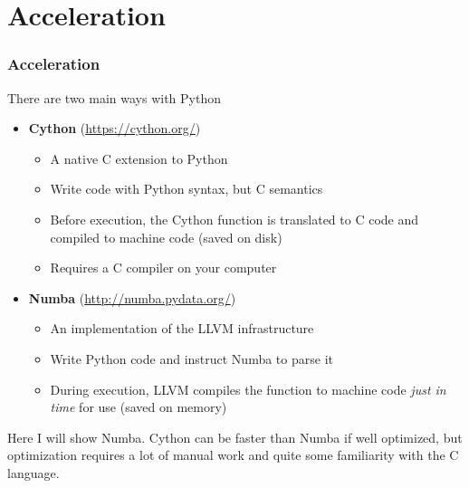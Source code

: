 \documentclass[10pt, aspectratio=1610]{beamer}
\begin{document}
\section{Acceleration}

\begin{frame}
  \frametitle{Acceleration}

  There are two main ways with Python

  \begin{itemize}
    \item \textbf{Cython} (\url{https://cython.org/})
      \begin{itemize}
        \item A native C extension to Python
        \item Write code with Python syntax, but C semantics
        \item Before execution, the Cython function is translated to C code and compiled to machine code (saved on disk)
        \item Requires a C compiler on your computer
      \end{itemize}
    \item \textbf{Numba} (\url{http://numba.pydata.org/})
      \begin{itemize}
        \item An implementation of the LLVM infrastructure
        \item Write Python code and instruct Numba to parse it
        \item During execution, LLVM compiles the function to machine code \emph{just in time} for use (saved on memory)
      \end{itemize}
  \end{itemize}

  Here I will show \alert{Numba}.
  Cython can be faster than Numba if well optimized, but optimization requires a lot of manual work and quite some familiarity with the C language.

\end{frame}
\end{document}
